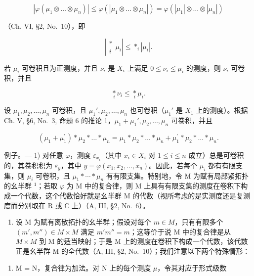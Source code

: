 \[
\left| \varphi \left(\mu_ {1} \otimes \dots \otimes \mu_ {n}\right) \right| \leqslant \varphi \left(\left| \mu_ {1} \otimes \dots \otimes \mu_ {n} \right|\right) = \varphi \left(\left| \mu_ {1} \right| \otimes \dots \otimes \left| \mu_ {n} \right|\right)
\]

（Ch. VI, §2, No.~10），即

\[
\left| \begin{array}{c} * \\ i \end{array} \mu_ {i} \right| \leqslant * _ {i} | \mu_ {i} |.\tag{2}
\]

若 \(\mu_{i}\) 可卷积且为正测度，并且 \(\nu_{i}\) 是 \(X_{i}\) 上满足 \(0 \leqslant \nu_{i} \leqslant \mu_{i}\) 的测度，则 \(\nu_{i}\) 可卷积，并且

\[
\underset {i} {\ast} \nu_ {i} \leqslant \underset {i} {\ast} \mu_ {i}.
\]

设 \(\mu_1, \mu_2, \ldots, \mu_n\) 可卷积，且 \(\mu_1', \mu_2, \ldots, \mu_n\) 也可卷积（\(\mu_1'\) 是 \(X_1\) 上的测度）。根据 Ch. V, §6, No.~3, 命题 6 的推论 1，\(\mu_1 + \mu_1', \mu_2, \ldots, \mu_n\) 可卷积，并且

\[
\left(\mu_ {1} + \mu_ {1} ^ {\prime}\right) * \mu_ {2} * \dots * \mu_ {n} = \mu_ {1} * \mu_ {2} * \dots * \mu_ {n} + \mu_ {1} ^ {\prime} * \mu_ {2} * \dots * \mu_ {n}.
\]

例子。--- 1) 对任意 \(\varphi\)，测度 \(\varepsilon_{x_i}\)（其中 \(x_i \in X_i\) 对 \(1 \leqslant i \leqslant n\) 成立）总是可卷积的，其卷积积为 \(\varepsilon_y\)，其中 \(y = \varphi(x_1, x_2, \ldots, x_n)\)。因此，若每个 \(\mu_i\) 都有有限支集，则 \(\mu_i\) 可卷积，且 \(\mu_1 * \cdots * \mu_n\) 有有限支集。特别地，令 M 为赋有局部紧拓扑的幺半群 \(^1\)；若取 \(\varphi\) 为 M 中的复合律，则 M 上具有有限支集的测度在卷积下构成一个代数，这个代数恰好就是幺半群 M 的代数（视所考虑的是实测度还是复测度而分别取在 R 或 C 上）（A, III, §2, No.~6）。

\begin{enumerate}
\def\labelenumi{\arabic{enumi})}
\setcounter{enumi}{1}
\tightlist
\item
  设 M 为赋有离散拓扑的幺半群；假设对每个 \(m \in M\)，只有有限多个 \((m', m'') \in M \times M\) 满足 \(m'm'' = m\)；这等价于说 M 中的复合律是从 \(M \times M\) 到 M 的适当映射；于是 M 上的测度在卷积下构成一个代数，该代数正是幺半群 M 的全代数（A, III, §2, No.~10）；我们注意以下两个特殊情形：
\end{enumerate}

\begin{enumerate}
\def\labelenumi{\alph{enumi})}
\tightlist
\item
  M = N，复合律为加法。对 N 上的每个测度 \(\mu\)，令其对应于形式级数
\end{enumerate}

